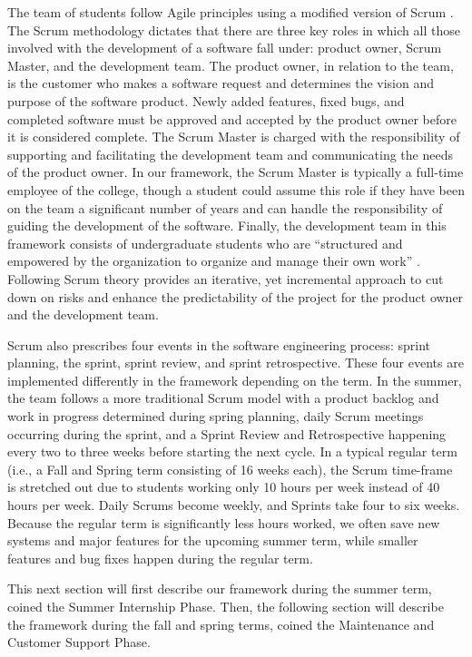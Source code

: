 The team of students follow Agile principles \cite{agilemanifesto} using a modified version of Scrum \cite{thescrumguide}. The Scrum methodology dictates that there are three key roles in which all those involved with the development of a software fall under: product owner, Scrum Master, and the development team. The product owner, in relation to the team, is the customer who makes a software request and determines the vision and purpose of the software product. Newly added features, fixed bugs, and completed software must be approved and accepted by the product owner before it is considered complete. The Scrum Master is charged with the responsibility of supporting and facilitating the development team and communicating the needs of the product owner. In our framework, the Scrum Master is typically a full-time employee of the college, though a student could assume this role if they have been on the team a significant number of years and can handle the responsibility of guiding the development of the software. Finally, the development team in this framework consists of undergraduate students who are ``structured and empowered by the organization to organize and manage their own work'' \cite{thescrumguide}. Following Scrum theory provides an iterative, yet incremental approach to cut down on risks and enhance the predictability of the project for the product owner and the development team.

Scrum also prescribes four events in the software engineering process: sprint planning, the sprint, sprint review, and sprint retrospective. These four events are implemented differently in the framework depending on the term.  In the summer, the team follows a more traditional Scrum model with a product backlog and work in progress determined during spring planning, daily Scrum meetings occurring during the sprint, and a Sprint Review and Retrospective happening every two to three weeks before starting the next cycle. In a typical regular term (i.e., a Fall and Spring term consisting of 16 weeks each), the Scrum time-frame is stretched out due to students working only 10 hours per week instead of 40 hours per week. Daily Scrums become weekly, and Sprints take four to six weeks. Because the regular term is significantly less hours worked, we often save new systems and major features for the upcoming summer term, while smaller features and bug fixes happen during the regular term.

This next section will first describe our framework during the summer term, coined the Summer Internship Phase. Then, the following section will describe the framework during the fall and spring terms, coined the Maintenance and Customer Support Phase.

